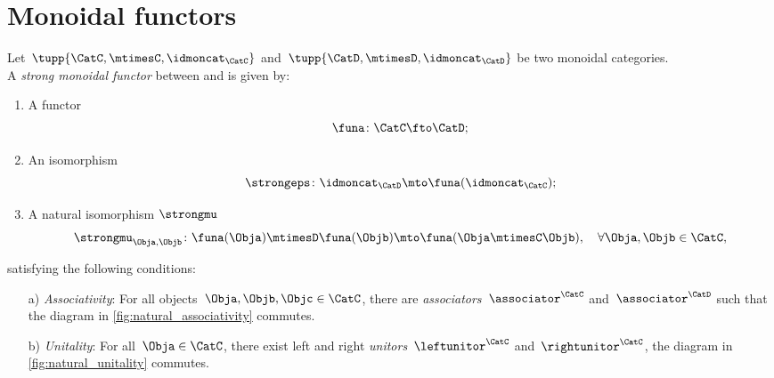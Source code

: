 
\section{Monoidal functors}
\label{sec:monoidal-functors}
\begin{ctdefinition}
    \label{def:strong-monoidal-functor}
    Let~$\tupp{\CatC,\mtimesC,\idmoncat_{\CatC}}$ and~$\tupp{\CatD,\mtimesD,\idmoncat_{\CatD}}$ be two monoidal categories.
    \\
    A \emph{strong monoidal functor} between \CatC and \CatD is given by:
    \begin{enumerate}
        \item A functor
              \begin{equation}
                  \funa \colon \CatC \fto \CatD;
              \end{equation}
        \item An isomorphism
              \begin{equation}
                  \strongeps\colon \idmoncat_{\CatD}\mto \funa(\idmoncat_{\CatC});
              \end{equation}
        \item A natural isomorphism $\strongmu$
              \begin{equation}
                  \strongmu_{\Obja,\Objb}\colon \funa(\Obja)\mtimesD \funa(\Objb) \mto \funa(\Obja \mtimesC \Objb),\quad \forall \Obja,\Objb\in \CatC,
              \end{equation}
    \end{enumerate}
    satisfying the following conditions:
    \begin{enumerate}
        \item[a)] \emph{Associativity}: For all objects~$\Obja,\Objb,\Objc\in \CatC$, there are  \emph{associators}~$\associator^\CatC$ and~$\associator^\CatD$ such that the diagram in \cref{fig:natural_associativity} commutes.
        \item[b)] \emph{Unitality}: For all~$\Obja\in \CatC$, there exist left and right \emph{unitors}~$\leftunitor^\CatC$ and~$\rightunitor^\CatC$, the diagram in
            \cref{fig:natural_unitality} commutes.
    \end{enumerate}
\end{ctdefinition}

